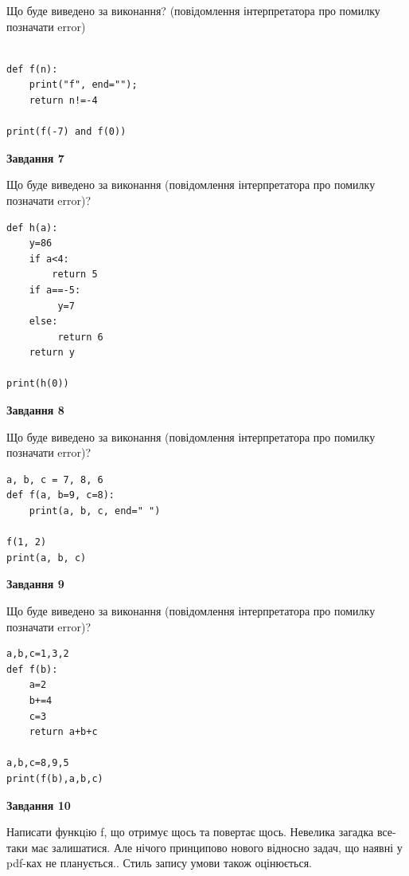\documentclass[12pt, ukrainian]{article}
\begin{document}
{\begin {large}
Що буде виведено за виконання? (повідомлення інтерпретатора про помилку позначати error)\par
\begin{verbatim}

def f(n):
    print("f", end="");
    return n!=-4

print(f(-7) and f(0))
\end{verbatim}

{\begin {center}\textbf{Завдання 7}\end {center}}

Що буде виведено за виконання (повідомлення інтерпретатора про помилку позначати error)?\par
\begin{verbatim}
def h(a):
    y=86
    if a<4: 
        return 5
    if a==-5:
         y=7
    else:
         return 6
    return y

print(h(0))
\end{verbatim}

{\begin {center}\textbf{Завдання 8}\end {center}}

Що буде виведено за виконання (повідомлення інтерпретатора про помилку позначати error)?\par
\begin{verbatim}
a, b, c = 7, 8, 6
def f(a, b=9, c=8):
    print(a, b, c, end=" ")

f(1, 2)
print(a, b, c)
\end{verbatim}

{\begin {center}\textbf{Завдання 9}\end {center}}

Що буде виведено за виконання (повідомлення інтерпретатора про помилку позначати error)?\par
\begin{verbatim}
a,b,c=1,3,2
def f(b):
    a=2
    b+=4
    c=3
    return a+b+c

a,b,c=8,9,5
print(f(b),a,b,c)
\end{verbatim}

{\begin {center}\textbf{Завдання 10}\end {center}}


Написати функцiю f, що отримує щось та повертає щось. Невелика загадка все-таки має залишатися. Але нічого принципово нового відносно задач, що наявні у pdf-ках не планується.. Стиль запису умови також оцінюється.\par
\end {large}}
\newpage
\end{document}

